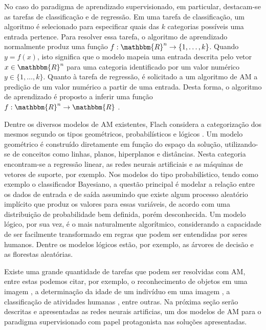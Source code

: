 No caso do paradigma de aprendizado supervisionado, em particular, destacam-se as tarefas de classificação e de regressão. Em uma tarefa de classificação, um algoritmo é selecionado para especificar quais das $k$ categorias possíveis uma entrada pertence. Para resolver essa tarefa, o algoritmo de aprendizado normalmente produz uma função $f : \mathbbm{R}^n \rightarrow \{1, \ldots, k\}$. Quando $y = f(x)$, isto significa que o modelo mapeia uma entrada descrita pelo vetor $x \in \mathbbm{R}^n$ para uma categoria identificado por um valor numérico $y \in \{1, \ldots, k\} $. Quanto à tarefa de regressão, é solicitado a um algoritmo de AM a predição de um valor numérico a partir de uma entrada. Desta forma, o algoritmo de aprendizado é proposto a inferir uma função $f : \mathbbm{R}^n \rightarrow \mathbbm{R}$ \cite{goodfellow}.


Dentre os diversos modelos de AM existentes, Flach considera a categorização dos mesmos segundo os tipos geométricos, probabilísticos e lógicos \cite{flach}. Um modelo geométrico é construído diretamente em função do espaço da solução, utilizando-se de conceitos como linhas, planos, hiperplanos e distâncias. Nesta categoria encontram-se a regressão linear, as redes neurais artificiais e as máquinas de vetores de suporte, por exemplo. Nos modelos do tipo probabilístico, tendo como exemplo o classificador Bayesiano, a questão principal é modelar a relação entre os dados de entrada e de saída assumindo que existe algum processo aleatório implícito que produz os valores para essas variáveis, de acordo com uma distribuição de probabilidade bem definida, porém desconhecida. Um modelo lógico, por sua vez, é o mais naturalmente algorítmico, considerando a capacidade de ser facilmente transformado em regras que podem ser entendidas por seres humanos. Dentre os modelos lógicos estão, por exemplo, as árvores de decisão e as florestas aleatórias.


Existe uma grande quantidade de tarefas que podem ser resolvidas com AM, entre estas podemos citar, por exemplo, o reconhecimento de objetos em uma imagem \cite{pathak}, a determinação da idade de um indivíduo em uma imagem \cite{nicoli-tcc}, a classificação de atividades humanas \cite{lira}, entre outras. Na próxima seção serão descritas e apresentadas as redes neurais artificias, um dos modelos de AM para o paradigma supervisionado com papel protagonista nas soluções apresentadas.

